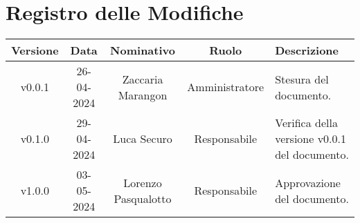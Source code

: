 \section*{\Large Registro delle Modifiche}
    \begin{table}[h]
        \centering
        \renewcommand\tabularxcolumn[1]{m{#1}} %
        \renewcommand{\arraystretch}{1.5}
        \begin{tabularx}{0.98\textwidth}
            {c|c|c|c|>{\centering\arraybackslash}X}
            \rowcolor{black}
            \textbf{\color{white} Versione} & \textbf{\color{white} Data} & \textbf{\color{white} Nominativo} & \textbf{\color{white} Ruolo} & \textbf{\color{white} Descrizione} \\ 
            \hline

            v0.0.1 & 26-04-2024 & Zaccaria Marangon & Amministratore & Stesura del documento.\\
            v0.1.0 & 29-04-2024 & Luca Securo & Responsabile & Verifica della versione v0.0.1 del documento.\\
            v1.0.0 & 03-05-2024 & Lorenzo Pasqualotto & Responsabile & Approvazione del documento.\\
           
            \hline
        \end{tabularx}
    \end{table}